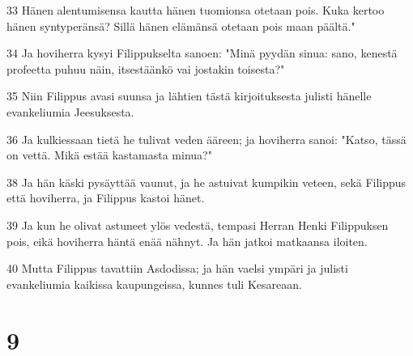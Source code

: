 \par 33 Hänen alentumisensa kautta hänen tuomionsa otetaan pois. Kuka kertoo hänen syntyperänsä? Sillä hänen elämänsä otetaan pois maan päältä."
\par 34 Ja hoviherra kysyi Filippukselta sanoen: "Minä pyydän sinua: sano, kenestä profeetta puhuu näin, itsestäänkö vai jostakin toisesta?"
\par 35 Niin Filippus avasi suunsa ja lähtien tästä kirjoituksesta julisti hänelle evankeliumia Jeesuksesta.
\par 36 Ja kulkiessaan tietä he tulivat veden ääreen; ja hoviherra sanoi: "Katso, tässä on vettä. Mikä estää kastamasta minua?"
\par 38 Ja hän käski pysäyttää vaunut, ja he astuivat kumpikin veteen, sekä Filippus että hoviherra, ja Filippus kastoi hänet.
\par 39 Ja kun he olivat astuneet ylös vedestä, tempasi Herran Henki Filippuksen pois, eikä hoviherra häntä enää nähnyt. Ja hän jatkoi matkaansa iloiten.
\par 40 Mutta Filippus tavattiin Asdodissa; ja hän vaelsi ympäri ja julisti evankeliumia kaikissa kaupungeissa, kunnes tuli Kesareaan.

\chapter{9}

